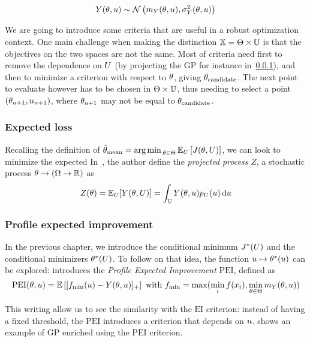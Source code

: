 \documentclass[../../Main_ManuscritThese.tex]{subfiles}
\begin{document}
\begin{equation}
  Y(\theta,u) \sim \mathcal{N}\left(m_{Y}(\theta,u), \sigma^2_Y(\theta,u) \right)
\end{equation}

We are going to introduce some criteria that are useful in a robust optimization context.
One main challenge when making the distinction $\mathbb{X} = \Theta \times \mathbb{U}$ is that the objectives on the two spaces are not the same. Most of criteria need first to remove the dependence on $U$ (by projecting the GP for instance in~\cref{ssec:expected_loss_GP_projection}), and then to minimize a criterion with respect to $\theta$, giving $\theta_{\mathrm{candidate}}$.
The next point to evaluate however has to be chosen in $\Theta \times \mathbb{U}$, thus needing to select a point $(\theta_{n+1}, u_{n+1})$, where $\theta_{n+1}$ may not be equal to $\theta_{\mathrm{candidate}}$.


\subsubsection{Expected loss}
\label{ssec:expected_loss_GP_projection}
Recalling the definition of $\hat{\theta}_{\mathrm{mean}} = \operatorname*{arg\,min \,}_{\theta \in \Theta} \mathbb{E}_{U}\left[J(\theta, U)\right]$, we can look to minimize the expected 
In~\cite{janusevskis_simultaneous_2010}, the author define the \emph{projected process} $Z$, a stochastic process $\theta \rightarrow \left(\Omega \rightarrow \mathbb{R}\right)$ as
\begin{equation}
  Z(\theta) = \mathbb{E}_U[Y(\theta, U)] = \int_{\mathbb{U}} Y(\theta, u) p_{U}(u)\,\mathrm{d}u
\end{equation}


\subsubsection{Profile expected improvement}
In the previous chapter, we introduce the conditional minimum $J^*(U)$ and the conditional minimizers $\theta^*(U)$. To follow on that idea, the function $u \mapsto \theta^*(u)$ can be explored: \cite{ginsbourger_bayesian_2014} introduces the \emph{Profile Expected Improvement} $\mathrm{PEI}$, defined as
\begin{equation}
  \label{eq:def_PEI}
  \mathrm{PEI}(\theta, u)= \mathbb{E}\left[[f_{\min}(u) - Y(\theta, u)]_+\right] \text{ with } f_{\min} = \max(\min_i f(x_i), \min_{\theta \in \Theta} m_Y(\theta, u))
\end{equation}

This writing allow us to see the similarity with the $\mathrm{EI}$ criterion: instead of having a fixed threshold, the $\mathrm{PEI}$ introduces a criterion that depends on $u$.  shows an example of GP enriched using the $\mathrm{PEI}$ criterion.
\end{document}
